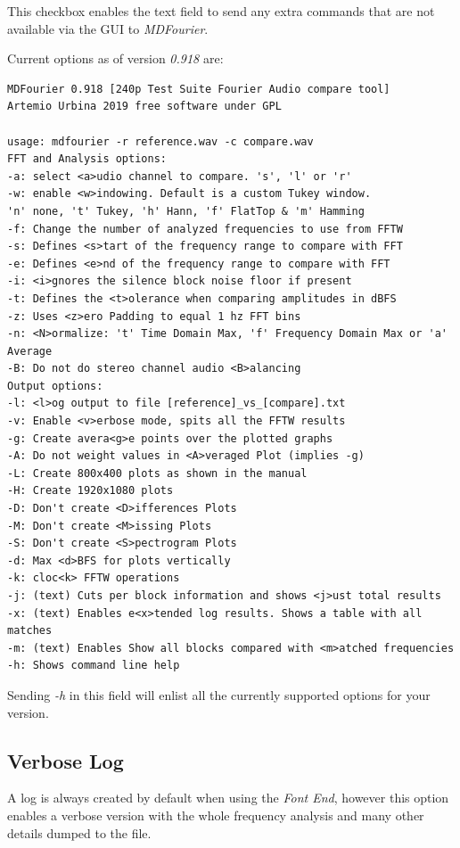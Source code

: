 \documentclass[10pt,a4paper]{report}
\begin{document}
\begin{appendices}
This checkbox enables the text field to send any extra commands that are not available via the GUI to \textit{MDFourier}. 

Current options as of version \textit{0.918} are:

\begin{verbatim}
MDFourier 0.918 [240p Test Suite Fourier Audio compare tool]
Artemio Urbina 2019 free software under GPL

usage: mdfourier -r reference.wav -c compare.wav
FFT and Analysis options:
-a: select <a>udio channel to compare. 's', 'l' or 'r'
-w: enable <w>indowing. Default is a custom Tukey window.
'n' none, 't' Tukey, 'h' Hann, 'f' FlatTop & 'm' Hamming
-f: Change the number of analyzed frequencies to use from FFTW
-s: Defines <s>tart of the frequency range to compare with FFT
-e: Defines <e>nd of the frequency range to compare with FFT
-i: <i>gnores the silence block noise floor if present
-t: Defines the <t>olerance when comparing amplitudes in dBFS
-z: Uses <z>ero Padding to equal 1 hz FFT bins
-n: <N>ormalize: 't' Time Domain Max, 'f' Frequency Domain Max or 'a' Average
-B: Do not do stereo channel audio <B>alancing
Output options:
-l: <l>og output to file [reference]_vs_[compare].txt
-v: Enable <v>erbose mode, spits all the FFTW results
-g: Create avera<g>e points over the plotted graphs
-A: Do not weight values in <A>veraged Plot (implies -g)
-L: Create 800x400 plots as shown in the manual
-H: Create 1920x1080 plots
-D: Don't create <D>ifferences Plots
-M: Don't create <M>issing Plots
-S: Don't create <S>pectrogram Plots
-d: Max <d>BFS for plots vertically
-k: cloc<k> FFTW operations
-j: (text) Cuts per block information and shows <j>ust total results
-x: (text) Enables e<x>tended log results. Shows a table with all matches
-m: (text) Enables Show all blocks compared with <m>atched frequencies
-h: Shows command line help
\end{verbatim}

Sending \textit{-h} in this field will enlist all the currently supported options for your version.

\subsection{Verbose Log}
\label{verbose}

A log is always created by default when using the \textit{Font End}, however this option enables a verbose version with the whole frequency analysis and many other details dumped to the file. 


\end{appendices}
\end{document}
